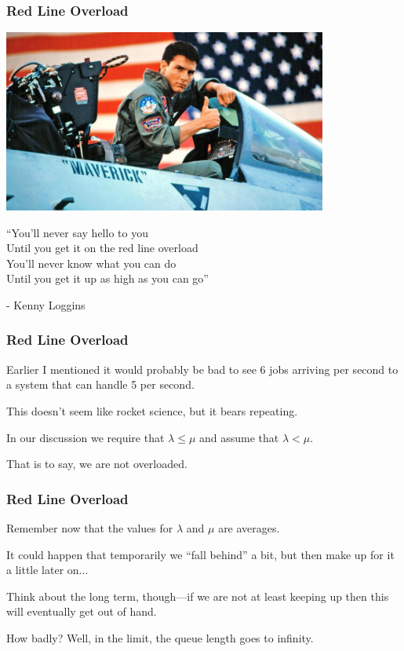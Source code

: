 \begin{frame}
\frametitle{Red Line Overload}

\begin{center}
	\includegraphics[width=0.8\textwidth]{images/topgun.jpg}
\end{center}

``You'll never say hello to you\\
Until you get it on the red line overload\\
You'll never know what you can do\\
Until you get it up as high as you can go''
 
\hfill - Kenny Loggins


\end{frame}



\begin{frame}
\frametitle{Red Line Overload}

Earlier I mentioned it would probably be bad to see 6 jobs arriving per second to a system that can handle 5 per second. 

This doesn't seem like rocket science, but it bears repeating. 

In our discussion we require that $\lambda \leq \mu$ and assume that $\lambda < \mu$. 

That is to say, we are not overloaded.

\end{frame}



\begin{frame}
\frametitle{Red Line Overload}

Remember now that the values for $\lambda$ and $\mu$ are averages. 

It could happen that temporarily we ``fall behind'' a bit, but then make up for it a little later on... 

Think about the long term, though---if we are not at least keeping up then this will eventually get out of hand. 

How badly? Well, in the limit, the queue length goes to infinity.

\end{frame}



